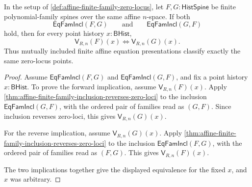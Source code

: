 \begin{theorem}
\label{thm:affine-mutual-family-inclusion-equal-zero-loci}
In the setup of \autoref{def:affine-finite-family-zero-locus}, let $F,G:\mathsf{HistSpine}$ be finite polynomial-family spines over the same affine $n$-space. If both
$$
\mathsf{EqFamIncl}(F,G)
\qquad\text{and}\qquad
\mathsf{EqFamIncl}(G,F)
$$
hold, then for every point history $x:\mathsf{BHist}$,
$$
\mathsf{V}_{R,n}(F)(x)
\Longleftrightarrow
\mathsf{V}_{R,n}(G)(x).
$$
Thus mutually included finite affine equation presentations classify exactly the same zero-locus points.
\end{theorem}
\begin{proof}
Assume $\mathsf{EqFamIncl}(F,G)$ and $\mathsf{EqFamIncl}(G,F)$, and fix a point history $x:\mathsf{BHist}$. To prove the forward implication, assume $\mathsf{V}_{R,n}(F)(x)$. Apply \autoref{thm:affine-finite-family-inclusion-reverses-zero-loci} to the inclusion $\mathsf{EqFamIncl}(G,F)$, with the ordered pair of families read as $(G,F)$. Since inclusion reverses zero-loci, this gives $\mathsf{V}_{R,n}(G)(x)$.

For the reverse implication, assume $\mathsf{V}_{R,n}(G)(x)$. Apply \autoref{thm:affine-finite-family-inclusion-reverses-zero-loci} to the inclusion $\mathsf{EqFamIncl}(F,G)$, with the ordered pair of families read as $(F,G)$. This gives $\mathsf{V}_{R,n}(F)(x)$.

The two implications together give the displayed equivalence for the fixed $x$, and $x$ was arbitrary.
\end{proof}

